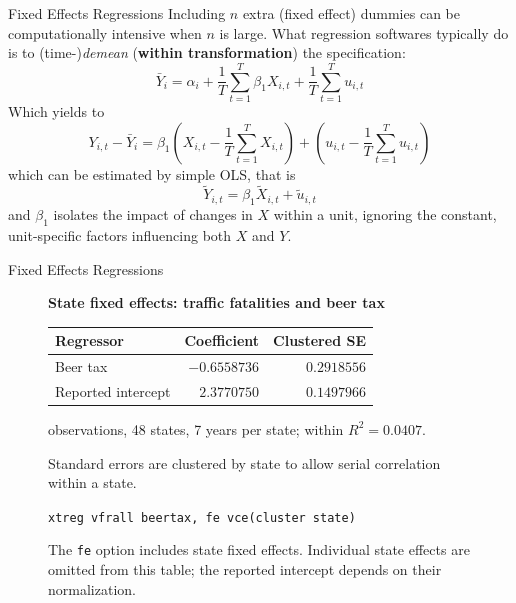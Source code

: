 \documentclass[notes,10pt, aspectratio=169]{beamer}
\begin{document}
\begin{frame}{Fixed Effects Regressions}
Including $n$ extra (fixed effect) dummies can be computationally intensive when $n$ is large. What regression softwares typically do is to (time-)\textit{demean} (\textbf{within transformation}) the specification:
    \begin{equation*}
        \bar{Y}_i = \alpha_i + \frac{1}{T}\sum_{t=1}^T \beta_1 X_{i,t}  + \frac{1}{T}\sum_{t=1}^T  u_{i,t}
    \end{equation*}
Which yields to
    \begin{equation*}
        Y_{i,t} - \bar{Y}_i =  \beta_1 (X_{i,t}-\frac{1}{T}\sum_{t=1}^T X_{i,t})  + (u_{i,t}-\frac{1}{T}\sum_{t=1}^T  u_{i,t})
    \end{equation*}
which can be estimated by simple OLS, that is
    \begin{equation*}
        \tilde{Y}_{i,t}= \beta_1 \tilde{X}_{i,t} + \tilde{u}_{i,t}
    \end{equation*}
and $\beta_1$ isolates the impact of changes in $X$ within a unit, ignoring the constant, unit-specific factors influencing both $X$ and $Y$.
\end{frame}

\begin{frame}{Fixed Effects Regressions}
\begin{figure}
  \centering
         \vspace{-1mm}
         \small
\textbf{State fixed effects: traffic fatalities and beer tax}\\[.5em]
\begin{tabular}{lrr}
\hline
Regressor & Coefficient & Clustered SE\\\hline
Beer tax & $-0.6558736$ & $0.2918556$\\
Reported intercept & $2.3770750$ & $0.1497966$\\\hline
\end{tabular}
\par{} observations, 48 states, 7 years per state; within $R^2=0.0407$.
\par\medskip
Standard errors are clustered by state to allow serial correlation within a state.
\par\medskip
\texttt{xtreg vfrall beertax, fe vce(cluster state)}
\par\medskip
The \texttt{fe} option includes state fixed effects. Individual state effects are omitted from this table; the reported intercept depends on their normalization.
\end{figure}
\end{frame}
\end{document}

